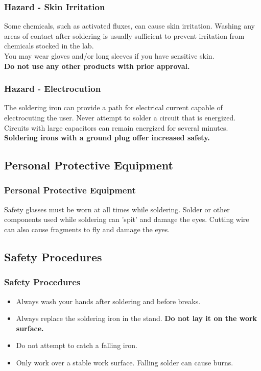 \documentclass{beamer}
\begin{document}
\begin{frame}[t]
	\frametitle{Hazard - Skin Irritation}
	Some chemicals, such as activated fluxes, can cause skin irritation. Washing any areas of contact after soldering is usually sufficient to prevent irritation from chemicals stocked in the lab.\\
	You may wear gloves and/or long sleeves if you have sensitive skin.\\
	\textbf{Do not use any other products with prior approval.}
\end{frame}
\begin{frame}[t]
	\frametitle{Hazard - Electrocution}
	The soldering iron can provide a path for electrical current capable of electrocuting 
	the user. Never attempt to solder a circuit that is energized. Circuits with large 
	capacitors can remain energized for several minutes.\\
	\textbf{Soldering irons with a ground plug offer increased safety.}
\end{frame}

\subsection{Personal Protective Equipment}
\begin{frame}[t]
	\frametitle{Personal Protective Equipment}
	Safety glasses must be worn at all times while soldering. Solder or other components 
	used while soldering can 'spit' and damage the eyes. Cutting wire can also cause 
	fragments to fly and damage the eyes.
\end{frame}

\subsection{Safety Procedures}
\begin{frame}[t]
	\frametitle{Safety Procedures}
	\begin{itemize}
	\item Always wash your hands after soldering and before breaks.
	\item Always replace the soldering iron in the stand. \textbf{Do not lay it on the work surface.}
	\item Do not attempt to catch a falling iron.
	\item Only work over a stable work surface. Falling solder can cause burns.
	\end{itemize}
\end{frame}
\end{document}
